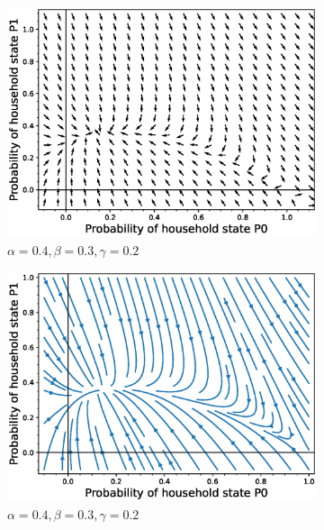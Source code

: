 \documentclass[paper=a4, fontsize=11pt, twoside, BCOR=12mm, parskip=full, listof=totoc]{scrreprt}
\begin{document}
{\begin{figure}[H]
\begin{subfigure}[b]{0.4\linewidth}
	\end{subfigure}
	\begin{subfigure}[b]{0.4\linewidth}
	  \includegraphics[width=\linewidth]{phase_portrait/022_g6.eps}
	  \caption{\(\alpha=0.4, \beta=0.3, \gamma=0.2\)}
	  \label{beta three phasevectorfield}
	\end{subfigure}
      \begin{subfigure}[b]{0.4\linewidth}
	  \includegraphics[width=\linewidth]{phase_portrait/022_g6s.eps}
	  \caption{\(\alpha=0.4, \beta=0.3, \gamma=0.2\)}
	  \label{beta three phasestreamplot}
	\end{subfigure}
	\begin{subfigure}[b]{0.4\linewidth}

\end{subfigure}
\end{figure}}
\end{document}
